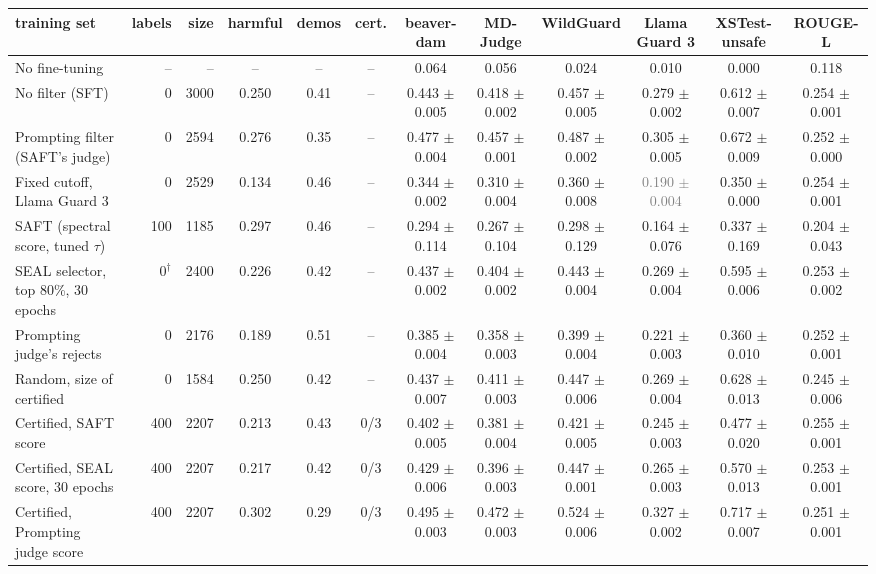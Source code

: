 \begin{tabular}{lrrccccccccc}
\toprule
training set & labels & size & harmful & demos & cert. & beaver-dam & MD-Judge & WildGuard & Llama Guard 3 & XSTest-unsafe & ROUGE-L \\
\midrule
No fine-tuning & -- & -- & -- & -- & -- & 0.064 & 0.056 & 0.024 & 0.010 & 0.000 & 0.118 \\
No filter (SFT) & 0 & 3000 & 0.250 & 0.41 & -- & 0.443 $\pm$ 0.005 & 0.418 $\pm$ 0.002 & 0.457 $\pm$ 0.005 & 0.279 $\pm$ 0.002 & 0.612 $\pm$ 0.007 & 0.254 $\pm$ 0.001 \\
Prompting filter (SAFT's judge) & 0 & 2594 & 0.276 & 0.35 & -- & 0.477 $\pm$ 0.004 & 0.457 $\pm$ 0.001 & 0.487 $\pm$ 0.002 & 0.305 $\pm$ 0.005 & 0.672 $\pm$ 0.009 & 0.252 $\pm$ 0.000 \\
Fixed cutoff, Llama Guard 3 & 0 & 2529 & 0.134 & 0.46 & -- & 0.344 $\pm$ 0.002 & 0.310 $\pm$ 0.004 & 0.360 $\pm$ 0.008 & \textcolor{gray}{0.190 $\pm$ 0.004} & 0.350 $\pm$ 0.000 & 0.254 $\pm$ 0.001 \\
SAFT (spectral score, tuned $\tau$) & 100 & 1185 & 0.297 & 0.46 & -- & 0.294 $\pm$ 0.114 & 0.267 $\pm$ 0.104 & 0.298 $\pm$ 0.129 & 0.164 $\pm$ 0.076 & 0.337 $\pm$ 0.169 & 0.204 $\pm$ 0.043 \\
SEAL selector, top 80\%, 30 epochs & 0$^\dagger$ & 2400 & 0.226 & 0.42 & -- & 0.437 $\pm$ 0.002 & 0.404 $\pm$ 0.002 & 0.443 $\pm$ 0.004 & 0.269 $\pm$ 0.004 & 0.595 $\pm$ 0.006 & 0.253 $\pm$ 0.002 \\
Prompting judge's rejects & 0 & 2176 & 0.189 & 0.51 & -- & 0.385 $\pm$ 0.004 & 0.358 $\pm$ 0.003 & 0.399 $\pm$ 0.004 & 0.221 $\pm$ 0.003 & 0.360 $\pm$ 0.010 & 0.252 $\pm$ 0.001 \\
Random, size of certified & 0 & 1584 & 0.250 & 0.42 & -- & 0.437 $\pm$ 0.007 & 0.411 $\pm$ 0.003 & 0.447 $\pm$ 0.006 & 0.269 $\pm$ 0.004 & 0.628 $\pm$ 0.013 & 0.245 $\pm$ 0.006 \\
Certified, SAFT score & 400 & 2207 & 0.213 & 0.43 & 0/3 & 0.402 $\pm$ 0.005 & 0.381 $\pm$ 0.004 & 0.421 $\pm$ 0.005 & 0.245 $\pm$ 0.003 & 0.477 $\pm$ 0.020 & 0.255 $\pm$ 0.001 \\
Certified, SEAL score, 30 epochs & 400 & 2207 & 0.217 & 0.42 & 0/3 & 0.429 $\pm$ 0.006 & 0.396 $\pm$ 0.003 & 0.447 $\pm$ 0.001 & 0.265 $\pm$ 0.003 & 0.570 $\pm$ 0.013 & 0.253 $\pm$ 0.001 \\
Certified, Prompting judge score & 400 & 2207 & 0.302 & 0.29 & 0/3 & 0.495 $\pm$ 0.003 & 0.472 $\pm$ 0.003 & 0.524 $\pm$ 0.006 & 0.327 $\pm$ 0.002 & 0.717 $\pm$ 0.007 & 0.251 $\pm$ 0.001 \\

\end{tabular}
